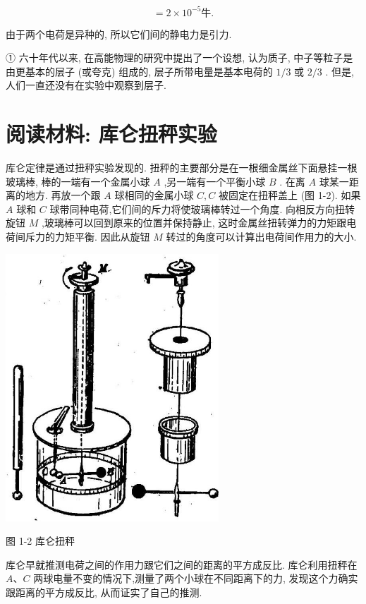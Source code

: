 \documentclass[10pt]{article}
\begin{document}
\[
= 2 \times {10}^{-5}\text{牛.}
\]

由于两个电荷是异种的, 所以它们间的静电力是引力.

① 六十年代以来, 在高能物理的研究中提出了一个设想, 认为质子, 中子等粒子是由更基本的层子 (或夸克) 组成的, 层子所带电量是基本电荷的 \(1/3\) 或 \(2/3\) . 但是,人们一直还没有在实验中观察到层子.

\section*{阅读材料: 库仑扭秤实验}

库仑定律是通过扭秤实验发现的. 扭秤的主要部分是在一根细金属丝下面悬挂一根玻璃棒, 棒的一端有一个金属小球 \(A\) ,另一端有一个平衡小球 \(B\) . 在离 \(A\) 球某一距离的地方. 再放一个跟 \(A\) 球相同的金属小球 \(C,C\) 被固定在扭秤盖上 (图 1-2). 如果 \(A\) 球和 \(C\) 球带同种电荷,它们间的斥力将使玻璃棒转过一个角度. 向相反方向扭转旋钮 \(M\) ,玻璃棒可以回到原来的位置并保持静止, 这时金属丝扭转弹力的力矩跟电荷间斥力的力矩平衡. 因此从旋钮 \(M\) 转过的角度可以计算出电荷间作用力的大小.

\begin{center}
\includegraphics[max width=0.6\textwidth]{images/01913056-1f15-74d8-9184-9aab52c9d66b_17_396112.jpg}
\end{center}

图 1-2 库仑扭秤

库仑早就推测电荷之间的作用力跟它们之间的距离的平方成反比. 库仑利用扭秤在 \(A\text{、}C\) 两球电量不变的情况下,测量了两个小球在不同距离下的力, 发现这个力确实跟距离的平方成反比, 从而证实了自己的推测.
\end{document}
